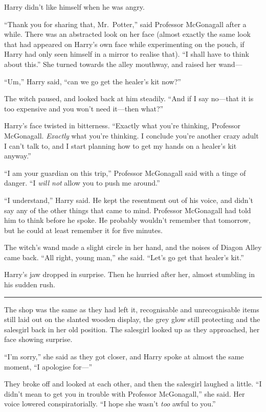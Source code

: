 Harry didn't like himself when he was angry.

``Thank you for sharing that, Mr.~Potter,'' said Professor McGonagall
after a while. There was an abstracted look on her face (almost exactly
the same look that had appeared on Harry's own face while experimenting
on the pouch, if Harry had only seen himself in a mirror to realise
that). ``I shall have to think about this.'' She turned towards the
alley mouthway, and raised her wand---

``Um,'' Harry said, ``can we go get the healer's kit now?''

The witch paused, and looked back at him steadily. ``And if I say
no---that it is too expensive and you won't need it---then what?''

Harry's face twisted in bitterness. ``Exactly what you're thinking,
Professor McGonagall. \emph{Exactly} what you're thinking. I conclude
you're another crazy adult I can't talk to, and I start planning how to
get my hands on a healer's kit anyway.''

``I am your guardian on this trip,'' Professor McGonagall said with a
tinge of danger. ``I \emph{will not} allow you to push me around.''

``I understand,'' Harry said. He kept the resentment out of his voice,
and didn't say any of the other things that came to mind. Professor
McGonagall had told him to think before he spoke. He probably wouldn't
remember that tomorrow, but he could at least remember it for five
minutes.

The witch's wand made a slight circle in her hand, and the noises of
Diagon Alley came back. ``All right, young man,'' she said. ``Let's go
get that healer's kit.''

Harry's jaw dropped in surprise. Then he hurried after her, almost
stumbling in his sudden rush.

\begin{center}\rule{3in}{0.4pt}\end{center}

The shop was the same as they had left it, recognisable and
unrecognisable items still laid out on the slanted wooden display, the
grey glow still protecting and the salesgirl back in her old position.
The salesgirl looked up as they approached, her face showing surprise.

``I'm sorry,'' she said as they got closer, and Harry spoke at almost
the same moment, ``I apologise for---''

They broke off and looked at each other, and then the salesgirl laughed
a little. ``I didn't mean to get you in trouble with Professor
McGonagall,'' she said. Her voice lowered conspiratorially. ``I hope she
wasn't \emph{too} awful to you.''

